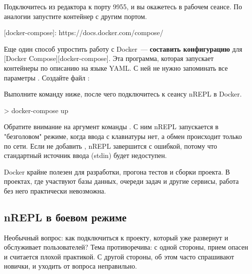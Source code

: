 Подключитесь из редактора к порту 9955, и вы окажетесь в рабочем сеансе. По аналогии запустите контейнер с другим портом.

[docker-compose]: https://docs.docker.com/compose/

Еще один способ упростить работу с Docker~--- \textbf{составить конфигурацию} для [Docker Compose][docker-compose]. Эта программа, которая запускает контейнеры по описанию на языке YAML. С ней не нужно запоминать все параметры . Создайте файл :

\begin{english}
\end{english}

Выполните команду ниже, после чего подключитесь к сеансу nREPL в Docker.

\begin{english}
  \begin{bash}
> docker-compose up
  \end{bash}
\end{english}

Обратите внимание на аргумент  команды . С ним nREPL запускается в "безголовом" режиме, когда ввода с клавиатуры нет, а обмен происходит только по сети. Если не добавить , nREPL завершится с ошибкой, потому что стандартный источник ввода (stdin) будет недоступен.

Docker крайне полезен для разработки, прогона тестов и сборки проекта. В проектах, где участвуют базы данных, очереди задач и другие сервисы, работа без него практически невозможна.

\subsection{nREPL в боевом режиме}

Необычный вопрос: как подключиться к проекту, который уже развернут и обслуживает пользователей? Тема противоречива: с одной стороны, прием опасен и считается плохой практикой. С другой стороны, об этом часто спрашивают новички, и уходить от вопроса неправильно.

